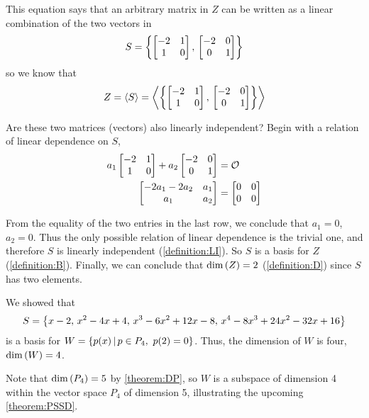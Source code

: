 \documentclass{ximera}
\begin{document}
\begin{example}
  This equation says that an arbitrary matrix in $Z$ can be written as a linear combination of the two vectors in
  \[
    S=\left\{\begin{bmatrix}-2&1\\1&0\end{bmatrix},\,\begin{bmatrix}-2&0\\0&1\end{bmatrix}\right\}
  \]
  so we know that
  \[
    Z=\left\langle S\right\rangle=
    \left\langle\left\{
        \begin{bmatrix}-2&1\\1&0\end{bmatrix},\,
        \begin{bmatrix}-2&0\\0&1\end{bmatrix}
      \right\}\right\rangle
  \]

  Are these two matrices (vectors) also linearly independent?  Begin with a relation of linear dependence on $S$,
  \begin{align*}
    a_1\begin{bmatrix}-2&1\\1&0\end{bmatrix}+
                               a_2\begin{bmatrix}-2&0\\0&1\end{bmatrix}&=\mathcal{O}\\
    \begin{bmatrix}-2a_1-2a_2&a_1\\a_1&a_2\end{bmatrix}&=
                                                         \begin{bmatrix}0&0\\0&0\end{bmatrix}
  \end{align*}
  
  From the equality of the two entries in the last row, we conclude
  that $a_1=0$, $a_2=0$.  Thus the only possible relation of linear
  dependence is the trivial one, and therefore $S$ is linearly
  independent (\ref{definition:LI}).  So $S$ is a basis for $Z$
  (\ref{definition:B}).  Finally, we can conclude that
  $\dim\left(Z\right)=2$ (\ref{definition:D}) since $S$ has two elements.
\end{example}

\begin{example}
  We showed that
  \[
    S=\left\{x-2,\,x^2-4x+4,\,x^3-6x^2+12x-8,\,x^4-8x^3+24x^2-32x+16\right\}
  \]
  is a basis for $W=\setparts{p(x)}{p\in P_4,\ p(2)=0}$.  Thus, the
  dimension of $W$ is four, $\dim\left(W\right)=4$.

  Note that $\dim\left(P_4\right)=5$ by \ref{theorem:DP}, so $W$ is a
  subspace of dimension 4 within the vector space $P_4$ of dimension
  5, illustrating the upcoming \ref{theorem:PSSD}.
\end{example}
\end{document}
